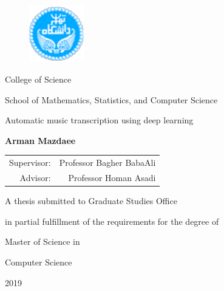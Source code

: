 \begin{latin}

\begin{figure}
    \centering
    \includegraphics[height=2.5cm]{./statics/UT-Logo.pdf}
\end{figure}

\begin{center}
    College of Science

    School of Mathematics, Statistics, and Computer Science
\end{center}

\vspace{1cm}

\begin{center}
\huge{Automatic music transcription using deep learning}
\end{center}

\vspace{1cm}

\begin{center}
    \textbf{Arman Mazdaee}
\end{center}

\begin{center}
    \begin{tabular}{rr}
        Supervisor: & Professor Bagher BabaAli
        \\
        Advisor: & Professor Homan Asadi
    \end{tabular}
\end{center}

\vspace{3cm}

\begin{center}
    A thesis submitted to Graduate Studies Office

    in partial fulfillment of the requirements for the degree of

    Master of Science in

    Computer Science
\end{center}

\begin{center}
    2019
\end{center}

\end{latin}

\pagestyle{empty}
\pagenumbering{}